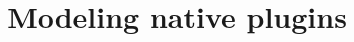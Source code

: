 \documentclass[a4paper,11pt]{article}
\date{}
\theoremstyle{definition}
\begin{document}
\title{Modeling native plugins}
\maketitle








\end{document}
